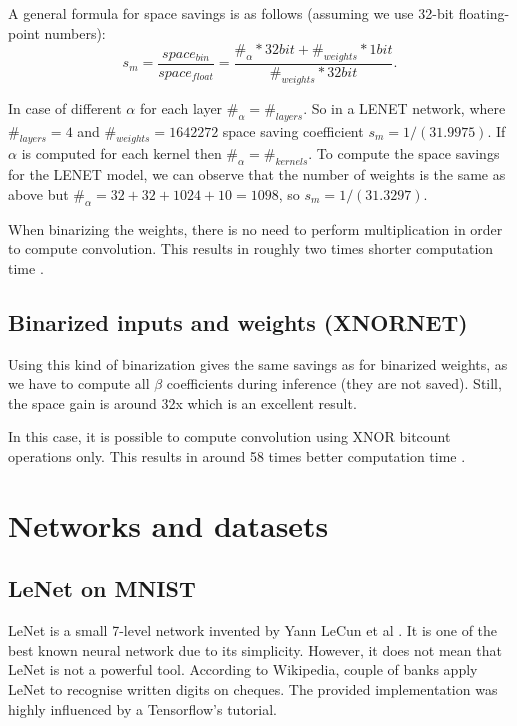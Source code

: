 \documentclass[licencjacka]{pracamgr}
\begin{document}
        A general formula for space savings is as follows (assuming we use 32-bit floating-point numbers):
        $$s_m =  \frac{space_{bin}}{space_{float}} = \frac{\#_\alpha * 32bit + \#_{weights}*1bit}{\#_{weights} * 32bit} \text{.}$$
        
        In case of different $\alpha$ for each layer $\#_\alpha = \#_{layers}$. So in a LENET network, where $\#_{layers} = 4$ and $\#_{weights} = 1642272$ space saving coefficient $s_m = 1/(31.9975)$. If $\alpha$ is computed for each kernel then $\#_\alpha = \#_{kernels}$. To compute the space savings for the LENET model, we can observe that the number of weights is the same as above but $\#_\alpha = 32+32+1024+10 = 1098$, so $s_m = 1/(31.3297)$.
            
	    When binarizing the weights, there is no need to perform multiplication in order to compute convolution. This results in roughly two times shorter computation time \cite{xnornet}.
	    
	    \section{Binarized inputs and weights (XNORNET)}
	    Using this kind of binarization gives the same savings as for binarized weights, as we have to compute all $\beta$ coefficients during inference (they are not saved). Still, the space gain is around 32x which is an excellent result.
	    
	    In this case, it is possible to compute convolution using XNOR bitcount operations only. This results in around 58 times better computation time \cite{xnornet}.

\chapter{Networks and datasets}
		\section{LeNet on MNIST}
 		LeNet is a small 7-level network invented by Yann LeCun et al \cite{lenet}. It is one of the best known neural network due to its simplicity. However, it does not mean that LeNet is not a powerful tool. According to Wikipedia, couple of banks apply LeNet to recognise written digits on cheques.  The provided implementation was highly influenced by a Tensorflow's tutorial. \\
\end{document}
